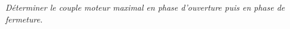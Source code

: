 \documentclass[10pt,fleqn]{article} %
\begin{document}
\begin{multicols}{2}
\begin{multicols}{2}
\subparagraph{}
\textit{Déterminer le couple moteur maximal en phase d’ouverture puis en phase de fermeture.}
\ifprof
\begin{corrige}~\\

\end{corrige}
\else
\fi

\ifprof
\end{multicols}
\else
\end{multicols}
\fi
\end{document}
